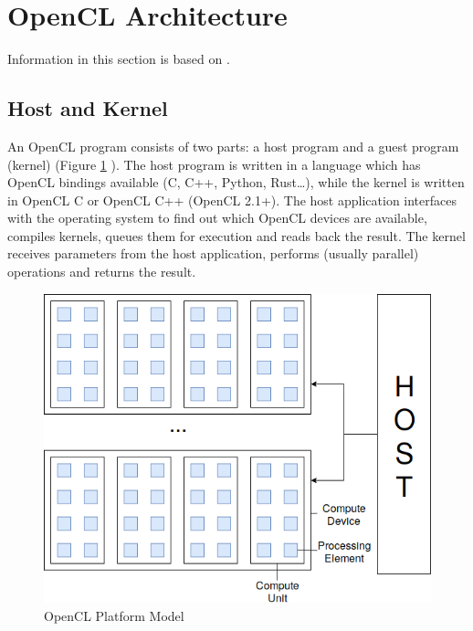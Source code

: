 
\section{OpenCL Architecture}

Information in this section is based on \cite{gaster2012heterogeneous}.

\subsection{Host and Kernel}

An OpenCL program consists of two parts: a host program and a guest program (kernel) (Figure \ref{fig:openclplatform} \cite{munshi2009opencl}). The host program is written in a language which has OpenCL bindings available (C, C++, Python, Rust\dots), while the kernel is written in OpenCL C or OpenCL C++ (OpenCL 2.1+). The host application interfaces with the operating system to find out which OpenCL devices are available, compiles kernels, queues them for execution and reads back the result. The kernel receives parameters from the host application, performs (usually parallel) operations and returns the result.

\begin{figure}[h]
    \includegraphics[width=\linewidth]{Figures/openclarch.png}
    \caption{OpenCL Platform Model}
    \label{fig:openclplatform}
\end{figure}

